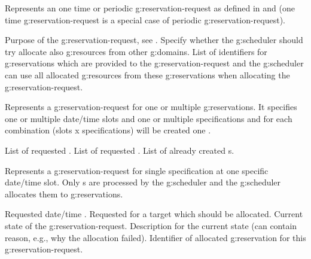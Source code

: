 \begin{Api}
Represents an one time or periodic \gls{g:reservation-request} as defined in  and  (one time \gls{g:reservation-request} is a special case of periodic \gls{g:reservation-request}).
\begin{ApiClassAttributes}
 Purpose of the \gls{g:reservation-request}, see .
 Specify whether the \gls{g:scheduler} should try allocate also \glspl{g:resource} from other \glspl{g:domain}.
 List of identifiers for \glspl{g:reservation} which are provided to the \gls{g:reservation-request} and the \gls{g:scheduler} can use all allocated \glspl{g:resource} from these \glspl{g:reservation} when allocating the \gls{g:reservation-request}.
\end{ApiClassAttributes}

Represents a \gls{g:reservation-request} for one or multiple \glspl{g:reservation}. It specifies one or multiple date/time slots and one or multiple specifications and for each combination (slots x specifications) will be created one .
\begin{ApiClassAttributes}
 List of requested .
 List of requested .
 List of already created s.
\end{ApiClassAttributes}

Represents a \gls{g:reservation-request} for single specification at one specific date/time slot.
Only s are processed by the \gls{g:scheduler} and the \gls{g:scheduler} allocates them to \glspl{g:reservation}. 
\begin{ApiClassAttributes}
 Requested date/time .
 Requested  for a target which should be allocated.
 Current state of the \gls{g:reservation-request}.
 Description for the current state (can contain reason, e.g., why the allocation failed).
 Identifier of allocated \gls{g:reservation} for this \gls{g:reservation-request}.
\end{ApiClassAttributes}


\end{Api}
